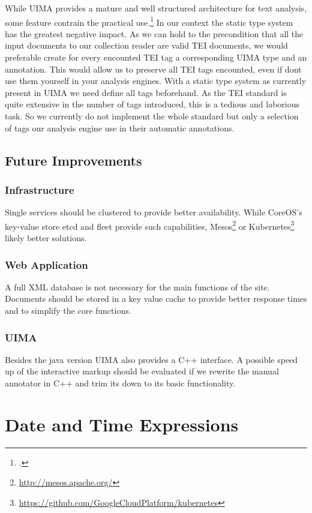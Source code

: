 \documentclass[12pt, draft]{article}
\begin{document}
While UIMA provides a mature and well structured architecture for text analysis,
some feature contrain the practical use.\footcite{Goetz:2014}
In our context the static type system has the greatest negative impact.
As we can hold to the precondition that all the input documents to our
collection reader are valid TEI documents, we would preferable
create for every encounted TEI tag a corresponding UIMA type and an annotation. 
This would allow us to preserve all TEI tags encounted, even if dont use them
yourself in your analysis engines. With a static type system
as currently present in UIMA we need define all tags beforehand.
As the TEI standard is quite extensive in the number of tags introduced,
this is a tedious and laborious task.
So we currently do not implement the whole standard but only a selection of tags
our analysis engine use in their automatic annotations.

\subsection{Future Improvements}

\subsubsection{Infrastructure}
Single services should be clustered to provide better availability. While CoreOS's key-value store etcd
and fleet provide such capabilities, Mesos\footnote{\url{http://mesos.apache.org/}}
 or Kubernetes\footnote{\url{https://github.com/GoogleCloudPlatform/kubernetes}}
 likely better solutions.

\subsubsection{Web Application}

A full XML database is not necessary for the main functions of the site.
Documents should be stored in a key value cache to provide
better response times and to simplify the core functions.

\subsubsection{UIMA}
Besides the java version UIMA also provides a C++ interface.
A possible speed up of the interactive markup should be evaluated
if we rewrite the manual annotator in C++ and trim its down to its basic
functionality.

\section{Date and Time Expressions}
\end{document}
